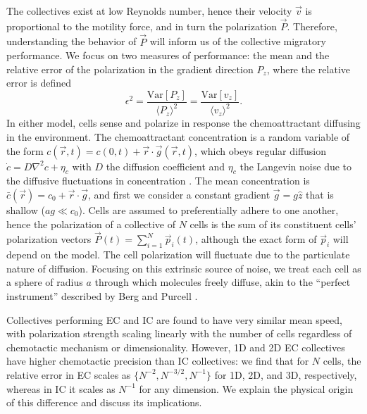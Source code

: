 The collectives exist at low Reynolds number, hence their velocity $\vec{v}$ is proportional to the motility force, and in turn the polarization $\vec{P}$.
Therefore, understanding the behavior of $\vec{P}$ will inform us of the collective migratory performance. We focus on two measures of performance: the mean and the relative error of the polarization in the gradient direction $P_z$, where the relative error is defined
\begin{equation} \label{eq:error1}
    \epsilon^2
    = \frac{\text{Var}[P_z]}{\langle P_z \rangle^2}
    = \frac{\text{Var}[v_z]}{\langle v_z \rangle^2}.
\end{equation}
In either model, cells sense and polarize in response the chemoattractant diffusing in the environment.
The chemoattractant concentration is a random variable of the form
$c(\vec{r},t) = c(0,t) + \vec{r}\cdot\vec{g}(\vec{r},t)$,
which obeys regular diffusion $\dot{c} = D\nabla^2c+\eta_c$ with $D$ the diffusion coefficient and $\eta_c$ the Langevin noise due to the diffusive fluctuations in concentration \cite{gardiner1985handbook,fancher2016fundamental}. The mean concentration is
$\bar{c}(\vec{r}) = c_0 + \vec{r}\cdot\vec{g}$,
and first we consider a constant gradient
$\vec{g} = g \hat{z}$ that is shallow ($ag \ll c_0$). Cells are assumed to preferentially adhere to one another, hence the polarization of a collective of $N$ cells is the sum of its constituent cells' polarization vectors $\vec{P}(t) = \sum_{i=1}^N \vec{p}_i(t)$, although the exact form of $\vec{p}_i$ will depend on the model.
The cell polarization will fluctuate due to the particulate nature of diffusion. Focusing on this extrinsic source of noise, we treat each cell as a sphere of radius $a$ through which molecules freely diffuse, akin to the ``perfect instrument'' described by Berg and Purcell \cite{berg1977physics}.

Collectives performing EC and IC are found to have very similar mean speed, with polarization strength scaling linearly with the number of cells regardless of chemotactic mechanism or dimensionality. However, 1D and 2D EC collectives have higher chemotactic precision than IC collectives: we find that for $N$ cells, the relative error in EC scales as
$\{N^{-2}, N^{-3/2}, N^{-1}\}$ for 1D, 2D, and 3D, respectively, whereas in IC it scales as $N^{-1}$ for any dimension. We explain the physical origin of this difference and discuss its implications.

